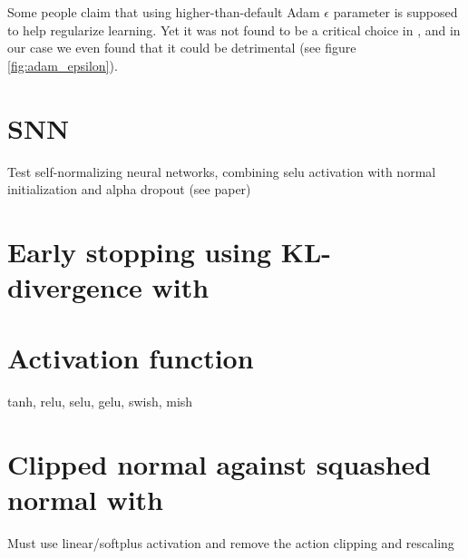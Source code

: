 Some people claim that using higher-than-default Adam $\epsilon$ parameter is supposed to help regularize learning. Yet it was not found to be a critical choice in \cite{andrychowicz2020}, and in our case we even found that it could be detrimental (see figure \ref{fig:adam_epsilon}).



\section{SNN}

Test self-normalizing neural networks, combining selu activation with normal initialization and alpha dropout (see paper)

\section{Early stopping using KL-divergence with \ppo}

\section{Activation function}

tanh, relu, selu, gelu, swish, mish

\section{Clipped normal against squashed normal with \ppo}

Must use linear/softplus activation and remove the action clipping and rescaling

